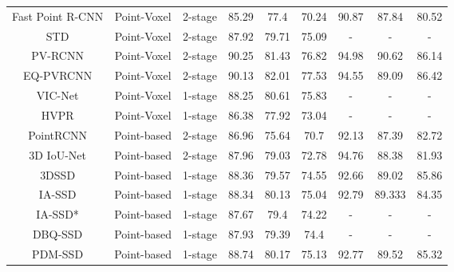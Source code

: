 \begin{table}
{\begin{tabular}{c|c|c||ccc|ccc}
		\hline
		Fast Point R-CNN        & Point-Voxel                & 2-stage               & 85.29 & 77.4     & 70.24         & 90.87 & 87.84    & 80.52          \\
		STD                     & Point-Voxel                & 2-stage               & 87.92 & 79.71    & 75.09         & -     & -        & -              \\
		PV-RCNN                 & Point-Voxel                & 2-stage               & 90.25 & 81.43    & 76.82         & 94.98 & 90.62    & 86.14          \\
		EQ-PVRCNN               & Point-Voxel                & 2-stage               & 90.13 & 82.01    & 77.53         & 94.55 & 89.09    & 86.42          \\
		VIC-Net                 & Point-Voxel                & 1-stage               & 88.25 & 80.61    & 75.83         & -     & -        & -              \\
		HVPR                    & Point-Voxel                & 1-stage               & 86.38 & 77.92    & 73.04         & -     & -        & -              \\ 
		\hline
		PointRCNN               & Point-based                & 2-stage               & 86.96 & 75.64    & 70.7          & 92.13 & 87.39    & 82.72          \\
		3D IoU-Net              & Point-based                & 2-stage               & 87.96 & 79.03    & 72.78         & 94.76 & 88.38    & 81.93          \\
		3DSSD                   & Point-based                & 1-stage               & 88.36 & 79.57    & 74.55         & 92.66 & 89.02    & 85.86          \\
		IA-SSD                  & Point-based                & 1-stage               & 88.34 & 80.13    & 75.04         & 92.79 & 89.333   & 84.35          \\
		IA-SSD*                 & Point-based                & 1-stage               & 87.67 & 79.4     & 74.22         & -     & -        & -              \\
		DBQ-SSD                 & Point-based                & 1-stage               & 87.93 & 79.39    & 74.4          & -     & -        & -              \\
		PDM-SSD                 & Point-based                & 1-stage               & 88.74 & 80.17    & 75.13         & 92.77 & 89.52    & 85.32         
	\end{tabular}}
\end{table}
